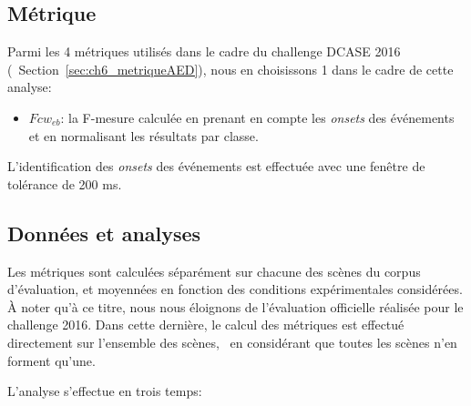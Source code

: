 \subsection{Métrique}

Parmi les 4 métriques utilisés dans le cadre du challenge DCASE 2016 (\cf~Section~\ref{sec:ch6_metriqueAED}), nous en choisissons 1 dans le cadre de cette analyse:

\begin{itemize}
\item $Fcw_{eb}$: la F-mesure calculée en prenant en compte les \emph{onsets} des événements et en normalisant les résultats par classe.
\end{itemize}

L'identification des \emph{onsets} des événements est effectuée avec une fenêtre de tolérance de 200 ms.

\subsection{Données et analyses}

Les métriques sont calculées séparément sur chacune des scènes du corpus d'évaluation, et moyennées en fonction des conditions expérimentales considérées. À noter qu'à ce titre, nous nous éloignons de l'évaluation officielle réalisée pour le challenge 2016. Dans cette dernière, le calcul des métriques est effectué directement sur l'ensemble des scènes, \ie~en considérant que toutes les scènes n'en forment qu'une.

L'analyse s'effectue en trois temps:

